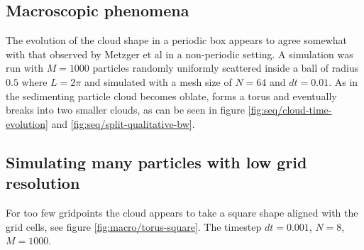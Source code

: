 \documentclass[a4paper,
twoside=false,abstract=false,numbers=noenddot,
titlepage=false,headings=small,parskip=half,version=last]{scrartcl}
\begin{document}
\subsection{Macroscopic phenomena}
The evolution of the cloud shape in a periodic box appears to agree somewhat with that observed by Metzger et al \cite{fallingclouds} in a non-periodic setting.
A simulation was run with $M=1000$ particles randomly uniformly scattered inside a ball of radius $0.5$ where $L=2\pi$ and simulated with a mesh size of $N=64$ and $dt=0.01$.
As in \cite{fallingclouds} the sedimenting particle cloud becomes oblate, forms a torus and eventually breaks into two smaller clouds, as can be seen in figure \ref{fig:seq/cloud-time-evolution} and \ref{fig:seq/split-qualitative-bw}.

\subsection{Simulating many particles with low grid resolution}
For too few gridpoints the cloud appears to take a square shape aligned with the grid cells, see figure \ref{fig:macro/torus-square}. The timestep $dt=0.001$, $N=8$, $M=1000$.
\end{document}
